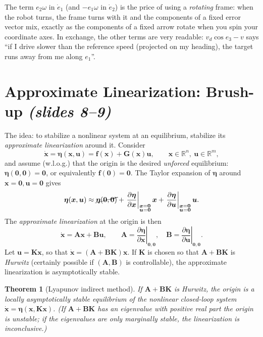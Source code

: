 \documentclass[11pt,a4paper]{article}
\newcommand{\R}{\mathbb{R}}
\newcommand{\vect}[1]{\bm{#1}}
\newcommand{\vd}{v_d}
\theoremstyle{plain}
\newtheorem{theorem}{Theorem}[section]
\theoremstyle{definition}
\theoremstyle{remark}
\begin{document}
\begin{intuition}
The term $e_2\omega$ in $\dot e_1$ (and $-e_1\omega$ in $\dot e_2$) is the price of using a \emph{rotating} frame: when the robot turns, the frame turns with it and the components of a fixed error vector mix, exactly as the components of a fixed arrow rotate when you spin your coordinate axes. In exchange, the other terms are very readable: $\vd\cos e_3-v$ says ``if I drive slower than the reference speed (projected on my heading), the target runs away from me along $e_1$''.
\end{intuition}

\section{Approximate Linearization: Brush-up \texorpdfstring{\emph{(slides 8--9)}}{(slides 8--9)}}

The idea: to stabilize a nonlinear system at an equilibrium, stabilize its \emph{approximate linearization} around it. Consider
\[
\dot{\vect x}=\vect\eta(\vect x,\vect u)=\vect f(\vect x)+\vect G(\vect x)\vect u,\qquad \vect x\in\R^n,\ \vect u\in\R^m,
\]
and assume (w.l.o.g.) that the origin is the desired \emph{unforced} equilibrium: $\vect\eta(\vect 0,\vect 0)=\vect 0$, or equivalently $\vect f(\vect 0)=\vect 0$. The Taylor expansion of $\vect\eta$ around $\vect x=\vect 0,\vect u=\vect 0$ gives
\[
\vect\eta(\vect x,\vect u)\approx\cancel{\vect\eta(\vect 0,\vect 0)}+\left.\frac{\partial\vect\eta}{\partial\vect x}\right|_{\substack{\vect x=\vect 0\\ \vect u=\vect 0}}\vect x+\left.\frac{\partial\vect\eta}{\partial\vect u}\right|_{\substack{\vect x=\vect 0\\ \vect u=\vect 0}}\vect u .
\]
The \emph{approximate linearization} at the origin is then
\[
\dot{\vect x}=\vect A\vect x+\vect B\vect u,\qquad \vect A=\left.\frac{\partial\vect\eta}{\partial\vect x}\right|_{\vect 0,\vect 0},\quad \vect B=\left.\frac{\partial\vect\eta}{\partial\vect u}\right|_{\vect 0,\vect 0}.
\]
Let $\vect u=\vect K\vect x$, so that $\dot{\vect x}=(\vect A+\vect B\vect K)\vect x$. If $\vect K$ is chosen so that $\vect A+\vect B\vect K$ is \emph{Hurwitz} (certainly possible if $(\vect A,\vect B)$ is controllable), the approximate linearization is asymptotically stable.

\begin{theorem}[Lyapunov indirect method]\label{thm:indirect}
If $\vect A+\vect B\vect K$ is Hurwitz, the origin is a \emph{locally} asymptotically stable equilibrium of the nonlinear closed-loop system $\dot{\vect x}=\vect\eta(\vect x,\vect K\vect x)$. (If $\vect A+\vect B\vect K$ has an eigenvalue with positive real part the origin is unstable; if the eigenvalues are only marginally stable, the linearization is inconclusive.)
\end{theorem}
\end{document}
